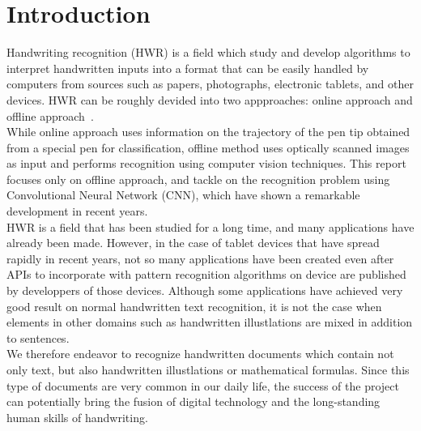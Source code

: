 \section{Introduction}

Handwriting recognition (HWR) is a field which study and develop algorithms to
interpret handwritten inputs into a format that can be easily handled by computers
from sources such as papers, photographs, electronic tablets, and other devices.
HWR can be roughly devided into two appproaches:
online approach and offline approach~\cite{plamondon2000online}.\\
While online approach uses information on the trajectory of the pen tip
obtained from a special pen for classification, offline method uses
optically scanned images as input and performs recognition using computer vision techniques.
This report focuses only on offline approach, and tackle on the recognition problem
using Convolutional Neural Network (CNN), which have shown a remarkable development in recent years.\\

HWR is a field that has been studied for a long time, and many applications have already been made.
However, in the case of tablet devices that have spread rapidly in recent years, not so many applications
have been created even after APIs to incorporate with pattern recognition algorithms on device are published
by developpers of those devices. Although some applications have achieved very good
result on normal handwritten text recognition, it is not the case when elements in other domains
such as handwritten illustlations are mixed in addition to sentences.\\

We therefore endeavor to recognize handwritten documents which contain not only text, but also
handwritten illustlations or mathematical formulas. Since this type of documents are very common
in our daily life, the success of the project can potentially bring the fusion of digital
technology and the long-standing human skills of handwriting. \\

